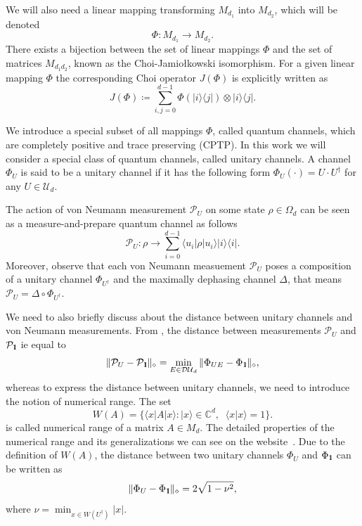 \documentclass[preprint,12pt, a4paper, dvipsnames]{elsarticle}
\newcommand{\ket}[1]{\ensuremath{|#1\rangle}}
\newcommand{\bra}[1]{\ensuremath{\langle#1|}}
\newcommand{\ketbra}[2]{\ensuremath{\ket{#1}\bra{#2}}}
\newcommand{\proj}[1]{\ensuremath{\ketbra{#1}{#1}}}
\newcommand{\braket}[2]{\ensuremath{\langle{#1}|{#2}\rangle}}
\newcommand{\1}{{\rm 1\hspace{-0.9mm}l}}
\newcommand{\Id}{{\rm 1\hspace{-0.9mm}l}}
\newcommand{\PP}{\mathcal{P}}
\newcommand{\UU}{\mathcal{U}}
\newcommand{\diaguni}{\ensuremath{\mathcal{DU}}}
\begin{document}
We will also need a linear mapping transforming $M_{d_1}$ into
$M_{d_2}$, which will be denoted
\begin{equation}
\Phi: M_{d_1 } \rightarrow M_{d_2}.
\end{equation}
There
exists a bijection between the set of linear mappings $\Phi$ and the set of matrices $M_{d_1d_2}$,  known as the Choi-Jamio{\l}kowski isomorphism.
For a given linear mapping $\Phi$ the corresponding Choi operator $J(\Phi)$ is explicitly written as
\begin{equation}
J(\Phi) \coloneqq \sum_{i,j=0}^{d- 1} \Phi(\ketbra{i}{j}) \otimes \ketbra{i}{j}. \end{equation}

We introduce a special subset of all mappings $\Phi$, called quantum channels, which are completely positive
and trace preserving (CPTP).
In this work we will consider a special class of quantum channels, called unitary channels.  A
channel
$\Phi_{U}$ is said to be a unitary channel if it has the following form $\Phi_U(\cdot) = U \cdot U^\dagger$ for any $U \in
\UU_d$.


The action of
von Neumann measurement $\PP_{U}$ on some state $\rho \in \Omega_d$ can be
seen as  a measure-and-prepare quantum channel as follows \begin{equation}
\PP_{U} : \rho \rightarrow \sum_{i=0}^{d-1} \bra{u_i} \rho \ket{u_i} \proj{i}.
\end{equation}
Moreover, observe that each von Neumann measuement $\PP_{U}$ poses a  composition of a unitary channel $\Phi_{U^\dagger}$ and the maximally dephasing channel $\Delta$, that means $\PP_{U} = \Delta \circ \Phi_{U^\dagger}$.

We need to also briefly discuss about the distance between unitary channels and von Neumann measurements. From \cite[Theorem 1]{puchala2018strategies}, the distance between measurements $\PP_U$ and
$\PP_\Id$ ie equal to
\begin{equation}
\|\PP_U - \PP_\Id\|_\diamond = \min_{E \in \diaguni_d} \|\Phi_{UE} -
\Phi_\Id\|_\diamond,
\end{equation} whereas to express the distance between unitary channels, we need to introduce the notion of numerical range. The set \begin{equation}
W(A) =\{\bra{x}A\ket{x}: \ket{x} \in
\mathbb{C}^d, \;
\;\braket{x}{x}=1\}.
\end{equation}
is called numerical range of  a matrix $A \in M_d$.
The detailed properties of the numerical range and its generalizations we can see on the website~\cite{nr}.
Due to the definition of $W(A)$, the distance between two unitary channels $\Phi_{U} $ and $\Phi_\Id$
can be written as
\begin{equation}
\| \Phi_U  - \Phi_{\1} \|_\diamond = 2 \sqrt{1-\nu^2},
\end{equation}
where $\nu = \min_{x \in W(U^\dagger)} |x|  $.
\end{document}
